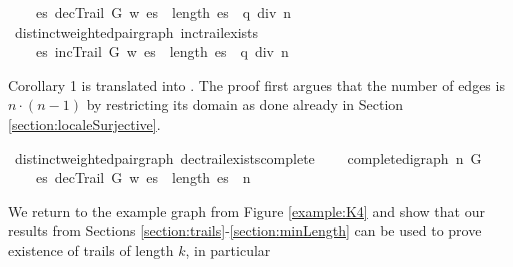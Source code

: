 \begin{isabellebody}
\ \ \ {\isachardoublequoteopen}{\isasymexists}\ es{\isachardot}\ decTrail\ G\ w\ es\ {\isasymand}\ length\ es\ {\isacharequal}\ q\ div\ n{\isachardoublequoteclose}%
\isadelimproof
%
\endisadelimproof
%
\isatagproof
%
\endisatagproof
{\isafoldproof}%
%
\isadelimproof
%
\endisadelimproof
\isanewline
{}\isamarkupfalse%
{\isacharparenleft}\ distinct{\isacharunderscore}weighted{\isacharunderscore}pair{\isacharunderscore}graph{\isacharparenright}\ inc{\isacharunderscore}trail{\isacharunderscore}exists{\isacharcolon}\ \isanewline
\ \ \ {\isachardoublequoteopen}{\isasymexists}\ es{\isachardot}\ incTrail\ G\ w\ es\ {\isasymand}\ length\ es\ {\isacharequal}\ q\ div\ n{\isachardoublequoteclose}%
\isadelimproof
%
\endisadelimproof
%
\isatagproof
%
\endisatagproof
{\isafoldproof}%
%
\isadelimproof
%
\endisadelimproof
%
\begin{isamarkuptext}%
Corollary 1 is translated into . The proof first argues
that the number of edges is $n\cdot(n-1)$ by restricting its domain as done already in Section \ref{section:localeSurjective}.%
\end{isamarkuptext}\isamarkuptrue%
%
\isadelimproof
%
\endisadelimproof
%
\isatagproof
%
\endisatagproof
{\isafoldproof}%
%
\isadelimproof
%
\endisadelimproof
{}\isamarkupfalse%
{\isacharparenleft}\ distinct{\isacharunderscore}weighted{\isacharunderscore}pair{\isacharunderscore}graph{\isacharparenright}\ dec{\isacharunderscore}trail{\isacharunderscore}exists{\isacharunderscore}complete{\isacharcolon}\ \isanewline
\ \ \ {\isachardoublequoteopen}complete{\isacharunderscore}digraph\ n\ G{\isachardoublequoteclose}\ \isanewline
\ \ \ {\isachardoublequoteopen}{\isacharparenleft}{\isasymexists}\ es{\isachardot}\ decTrail\ G\ w\ es\ {\isasymand}\ length\ es\ {\isacharequal}\ n{\isacharminus}{}{\isacharparenright}{\isachardoublequoteclose}%
\isadelimproof
%
\endisadelimproof
%
\isatagproof
%
\endisatagproof
{\isafoldproof}%
%
\isadelimproof
%
\endisadelimproof
%
\isadelimdocument
%
\endisadelimdocument
%
\isatagdocument
%
\isamarkuptrue%
%
\endisatagdocument
{\isafolddocument}%
%
\isadelimdocument
%
\endisadelimdocument
%
\begin{isamarkuptext}%
We return to the example graph from Figure \ref{example:K4} and show that our results from 
Sections \ref{section:trails}-\ref{section:minLength} can be used to prove existence of trails of length $k$, in particular

\end{isamarkuptext}
\end{isabellebody}

